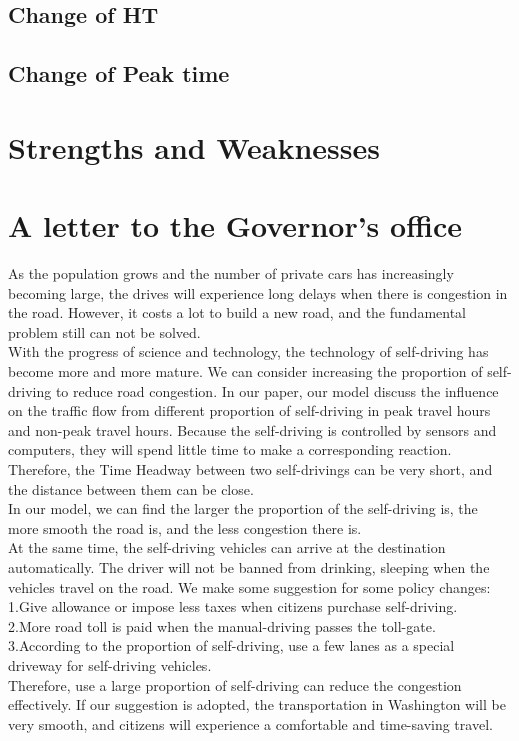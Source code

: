 \documentclass{mcmthesis}
\begin{document}
\subsection{Change of HT}

\subsection{Change of Peak time}

\section{Strengths and Weaknesses}

\section{A letter to the Governor's office}
As the population grows and the number of private cars has increasingly becoming large, the drives will experience long delays when there is congestion in the road. However, it costs a lot to build a new road, and the fundamental problem still can not be solved.\\
\indent With the progress of science and technology, the technology of self-driving has become more and more mature. We can consider increasing the proportion of self-driving to reduce road congestion.
In our paper, our model discuss the influence on the traffic flow from different proportion of self-driving in peak travel hours and non-peak travel hours. Because the self-driving is controlled by sensors and computers, they will spend little time to make a corresponding reaction. Therefore, the Time Headway between two self-drivings can be very short, and the distance between them can be close.\\ \indent In our model, we can find the larger the proportion of the self-driving is, the more smooth the road is, and the less congestion there is. \\
\indent At the same time, the self-driving vehicles can arrive at the destination automatically. The driver will not be banned from drinking, sleeping when the vehicles travel on the road.
We make some suggestion for some policy changes:\\
\indent 1.Give allowance or impose less taxes when citizens purchase self-driving.\\
\indent 2.More road toll is paid when the manual-driving passes the toll-gate.\\
\indent 3.According to the proportion of self-driving, use a few lanes as a special driveway for self-driving vehicles.\\
\indent Therefore, use a large proportion of self-driving can reduce the congestion effectively. If our suggestion is adopted, the transportation in Washington will be very smooth, and citizens will experience a comfortable and time-saving travel. 
\end{document}
